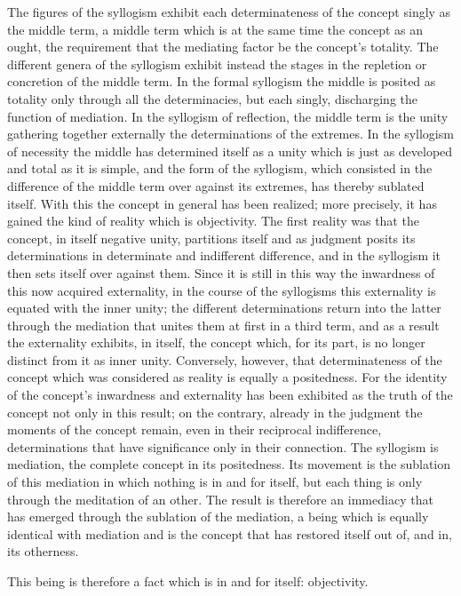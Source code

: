The figures of the syllogism
exhibit each determinateness of
the concept singly as the middle term,
a middle term which is at the same time
the concept as an ought,
the requirement that the mediating factor
be the concept's totality.
The different genera of the syllogism
exhibit instead the stages in the repletion
or concretion of the middle term.
In the formal syllogism the middle is
posited as totality only through all the determinacies,
but each singly, discharging the function of mediation.
In the syllogism of reflection,
the middle term is the unity
gathering together externally
the determinations of the extremes.
In the syllogism of necessity the middle
has determined itself as a unity
which is just as developed and total as it is
simple, and the form of the syllogism,
which consisted in the difference of
the middle term over against its extremes,
has thereby sublated itself.
With this the concept in general has been realized;
more precisely, it has gained
the kind of reality which is objectivity.
The first reality was that the concept,
in itself negative unity, partitions itself
and as judgment posits its determinations
in determinate and indifferent difference,
and in the syllogism it then sets itself over against them.
Since it is still in this way the inwardness
of this now acquired externality,
in the course of the syllogisms this externality is
equated with the inner unity;
the different determinations return into the latter
through the mediation that unites them at first in a third term,
and as a result the externality exhibits, in itself,
the concept which, for its part,
is no longer distinct from it as inner unity.
Conversely, however, that determinateness of the concept
which was considered as reality is equally a positedness.
For the identity of the concept's inwardness and externality
has been exhibited as the truth of the concept
not only in this result;
on the contrary, already in the judgment
the moments of the concept remain,
even in their reciprocal indifference,
determinations that have significance
only in their connection.
The syllogism is mediation,
the complete concept in its positedness.
Its movement is the sublation of this mediation
in which nothing is in and for itself,
but each thing is only through the meditation of an other.
The result is therefore an immediacy that has emerged
through the sublation of the mediation,
a being which is equally identical with mediation
and is the concept that has restored itself
out of, and in, its otherness.

This being is therefore a fact
which is in and for itself: objectivity.
